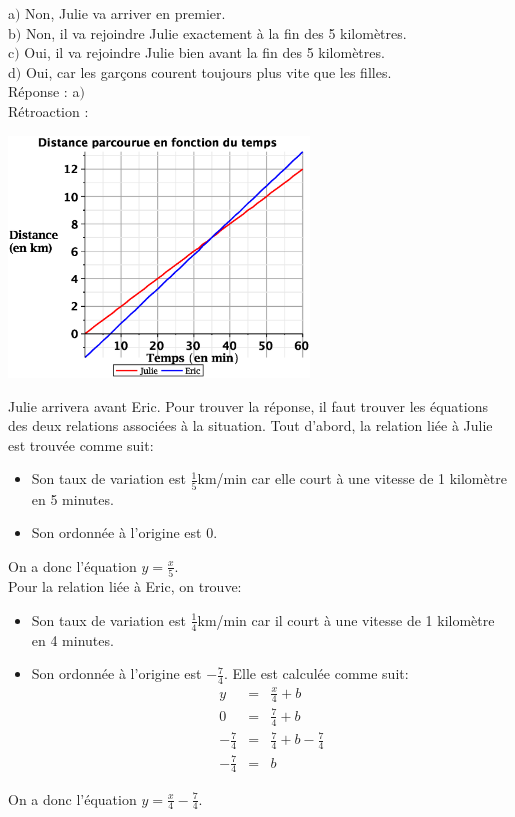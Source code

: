 \documentclass[letterpaper, 12pt]{article}
\begin{document}
a$)$ Non, Julie va arriver en premier.\\
b$)$ Non, il va rejoindre Julie exactement \`a la fin des 5 kilom\`etres.\\
c$)$ Oui, il va rejoindre Julie bien avant la fin des 5 kilom\`etres.\\
d$)$ Oui, car les gar\c cons courent toujours plus vite que les filles.\\

R\'eponse : a$)$\\

R\'etroaction :\\
\begin{center}
 \includegraphics[width=8cm,bb=20 172 575 619]{Q2089.eps}
\end{center}
Julie arrivera avant Eric. Pour trouver la r\'eponse, il faut trouver les \'equations des deux relations associ\'ees \`a la situation. Tout d'abord, la relation li\'ee \`a Julie est trouv\'ee comme suit:
\begin{itemize}
\item Son taux de variation est $\frac{1}{5}$km/min car elle court \`a une vitesse de 1 kilom\`etre en 5 minutes.
\item Son ordonn\'ee \`a l'origine est 0.
\end{itemize}
On a donc l'\'equation $y=\frac{x}{5}$.\\

Pour la relation li\'ee \`a Eric, on trouve:
\begin{itemize}
\item Son taux de variation est $\frac{1}{4}$km/min car il court \`a une vitesse de 1 kilom\`etre en 4 minutes.
\item Son ordonn\'ee \`a l'origine est $-\frac{7}{4}$. Elle est calcul\'ee comme suit:
\begin{eqnarray*}
y&=&\frac{x}{4}+b\\[2mm]
0&=&\frac{7}{4}+b\\[2mm]
-\frac{7}{4}&=&\frac{7}{4}+b-\frac{7}{4}\\[2mm]
-\frac{7}{4}&=&b
\end{eqnarray*}
\end{itemize}
On a donc l'\'equation $y=\frac{x}{4}-\frac{7}{4}$.\\
\end{document}
